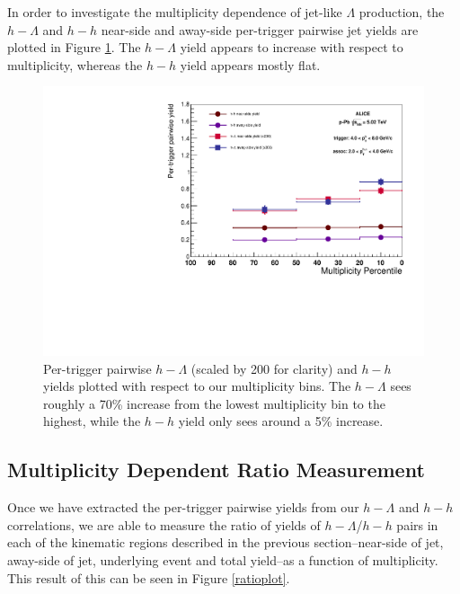 \documentclass[ALICE,manyauthors]{ALICE_analysis_notes}
\begin{document}
In order to investigate the multiplicity dependence of jet-like $\Lambda$ production, the $h-\Lambda$ and $h-h$ near-side and away-side per-trigger pairwise jet yields are plotted in Figure \ref{final_pairwise_yields}. The $h-\Lambda$ yield appears to increase with respect to multiplicity, whereas the $h-h$ yield appears mostly flat.

\begin{figure}[ht]
\centering
\includegraphics[width=6in]{figures/pairwise_plot_2_4.pdf}
\caption{Per-trigger pairwise $h-\Lambda$ (scaled by 200 for clarity) and $h-h$ yields plotted with respect to our multiplicity bins. The $h-\Lambda$ sees roughly a 70\% increase from the lowest multiplicity bin to the highest, while the $h-h$ yield only sees around a 5\% increase.}
\label{final_pairwise_yields}
\end{figure}


\subsection{Multiplicity Dependent Ratio Measurement}

Once we have extracted the per-trigger pairwise yields from our $h-\Lambda$ and $h-h$ correlations, we are able to measure the ratio of yields of $h-\Lambda$/$h-h$ pairs in each of the kinematic regions described in the previous section--near-side of jet, away-side of jet, underlying event and total yield--as a function of multiplicity. This result of this can be seen in Figure \ref{ratioplot}.
\end{document}
